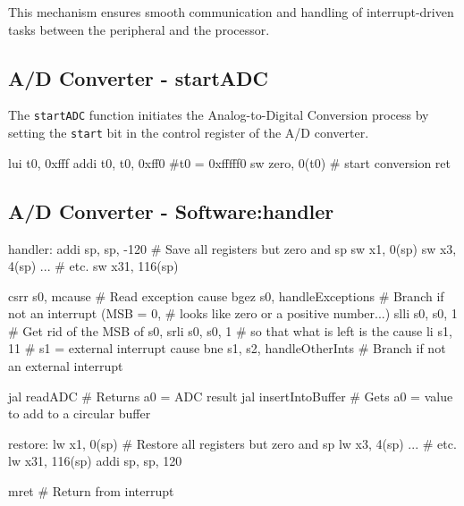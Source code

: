 This mechanism ensures smooth communication and handling of interrupt-driven tasks between the peripheral and the processor.

\subsection{A/D Converter - startADC}
The \texttt{startADC} function initiates the Analog-to-Digital Conversion process by setting the \texttt{start} bit in the control register of the A/D converter. \\
\begin{assembly}
    lui t0, 0xfff
    addi t0, t0, 0xff0 #t0 = 0xfffff0
    sw zero, 0(t0)     # start conversion
    ret
\end{assembly}
\subsection{A/D Converter - Software:handler}
\begin{assembly}
handler:
    addi sp, sp, -120          # Save all registers but zero and sp
    sw x1, 0(sp)
    sw x3, 4(sp)
    ...                        # etc.
    sw x31, 116(sp)

    csrr s0, mcause            # Read exception cause
    bgez s0, handleExceptions  # Branch if not an interrupt (MSB = 0,
                                # looks like zero or a positive number...)
    slli s0, s0, 1             # Get rid of the MSB of s0,
    srli s0, s0, 1             # so that what is left is the cause
    li s1, 11                  # s1 = external interrupt cause
    bne s1, s2, handleOtherInts # Branch if not an external interrupt

    jal readADC                # Returns a0 = ADC result
    jal insertIntoBuffer       # Gets a0 = value to add to a circular buffer

restore:
    lw x1, 0(sp)               # Restore all registers but zero and sp
    lw x3, 4(sp)
    ...                        # etc.
    lw x31, 116(sp)
    addi sp, sp, 120

    mret                       # Return from interrupt
\end{assembly}

